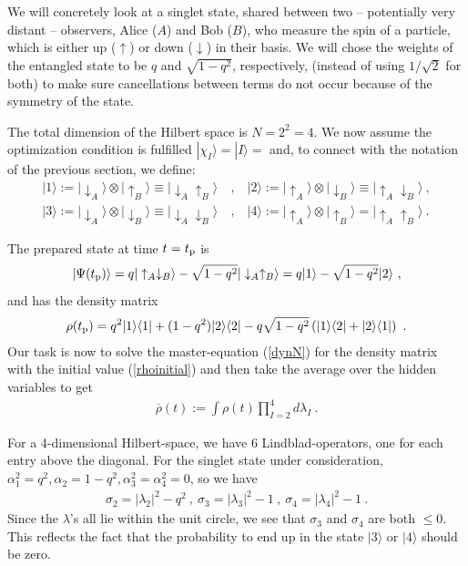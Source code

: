 \documentclass[11pt,twoside,A4]{article}
\def\beqn{\begin{eqnarray}}
\def\eeqn{\end{eqnarray}}
\begin{document}
We will concretely look at a singlet state, shared between two -- potentially very distant -- observers, Alice ($A$) and Bob ($B$),
who measure the spin of a particle, which is either up ($\uparrow$) or down ($\downarrow$) in their basis. We will chose the weights of the entangled state to be $q$ and $\sqrt{1-q^2}$, respectively, (instead of using $1/\sqrt{2}$ for both) to make sure cancellations between terms do not occur because of the symmetry of the state.

The total dimension of the Hilbert space is $N=2^2 = 4$. We now assume the optimization condition is fulfilled $|\chi_I\rangle=|I\rangle=$ and, to connect with the notation of the previous section, we define:
\beqn
 |1 \rangle := |\downarrow_{A} \rangle \otimes |\uparrow_{B} \rangle \equiv |\downarrow_A \uparrow_B \rangle ~&,&~
 |2 \rangle := |\uparrow_{A} \rangle \otimes |\downarrow_{B} \rangle \equiv |\uparrow_A \downarrow_B \rangle ~,\nonumber \\
|3 \rangle := |\downarrow_{A} \rangle \otimes |\downarrow_{B} \rangle \equiv |\downarrow_A \downarrow_B \rangle 
~&,&~ |4 \rangle := |\uparrow_{A} \rangle \otimes |\uparrow_{B} \rangle = |\uparrow_A \uparrow_B \rangle ~.
\eeqn

The prepared state at time $t=t_{\rm p}$ is
\begin{equation}
|\Psi (t_{\rm p}) \rangle= q |\uparrow_{A}\downarrow_{B}\rangle- \sqrt{1-q^2}|\downarrow_{A}\uparrow_{B}\rangle = q |1\rangle- \sqrt{1-q^2}|2\rangle~,
\end{equation}
and has the density matrix
\beqn
\rho(t_{\rm p}) = q^2  |1\rangle \langle1| + (1-q^2)|2\rangle \langle 2| - q \sqrt{1-q^2} \left( |1\rangle \langle2| +  |2\rangle \langle1| \right) ~.  \label{rhoinitial}
\eeqn
Our task is now to solve the master-equation (\ref{dynN}) for the density matrix with the initial value (\ref{rhoinitial}) and then take the average over the hidden variables to get
\beqn\label{roqm}
\overline \rho(t) := \int \rho(t) \prod_{I=2}^4  d \lambda_I ~.
\eeqn

For a 4-dimensional Hilbert-space, we have 6 Lindblad-operators, one for each entry above the diagonal. For the singlet state under consideration, $\alpha^2_1 =q^2, \alpha_2 = 1-q^2, \alpha_3^2 = \alpha_4^2 = 0$, so we have
\beqn
\sigma_2 = |\lambda_2|^2 - q^2 ~,~ \sigma_3 = |\lambda_3|^2 -1 ~,~\sigma_4 =  |\lambda_4|^2 -1~.
\eeqn
Since the $\lambda$'s all lie within the unit circle, we see that $\sigma_3$ and $\sigma_4$ are both $\leq 0$. This reflects the fact that the probability to end up in the state $|3\rangle$ or $|4 \rangle$ should be zero. 
\end{document}
